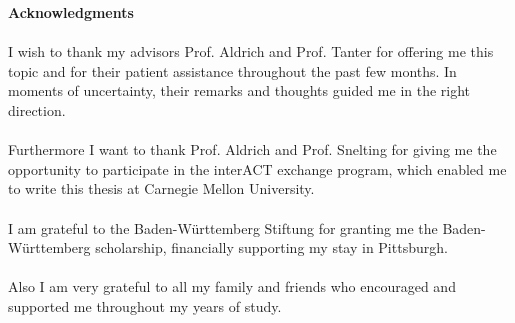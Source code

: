 
\vspace*{15\baselineskip}
\textbf{Acknowledgments}\\\\
I wish to thank my advisors Prof. Aldrich and Prof. Tanter for offering me this topic and for their patient assistance throughout the past few months. 
In moments of uncertainty, their remarks and thoughts guided me in the right direction.\\\\
Furthermore I want to thank Prof. Aldrich and Prof. Snelting for giving me the opportunity to participate in the interACT exchange program, which enabled me to write this thesis at Carnegie Mellon University.\\\\
I am grateful to the Baden-Württemberg Stiftung for granting me the Baden-Württemberg scholarship, financially supporting my stay in Pittsburgh. \\\\
Also I am very grateful to all my family and friends who encouraged and supported me throughout my years of study.


